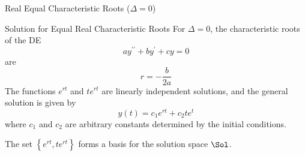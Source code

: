 \documentclass{beamer}
\begin{document}
\begin{frame}{Real Equal Characteristic Roots ($\Delta=0$)}
\begin{block}{Solution for Equal Real Characteristic Roots}
For $\Delta=0$, the characteristic roots of the DE
\begin{equation*}
ay^{\prime\prime}+by^{\prime}+cy=0
\end{equation*}
are
\begin{equation*}
r=-\dfrac{b}{2a}
\end{equation*}\pause
The functions $e^{rt}$ and $te^{rt}$ are linearly independent solutions, and the general solution is given by
\begin{equation*}
y(t)=c_1e^{rt}+c_2te^{t}
\end{equation*}
where $c_1$ and $c_2$ are arbitrary constants determined by the initial conditions.\pause

The set $\left\{e^{rt},te^{rt}\right\}$ forms a basis for the solution space $\Sol$.
\end{block}
\end{frame}
\end{document}
